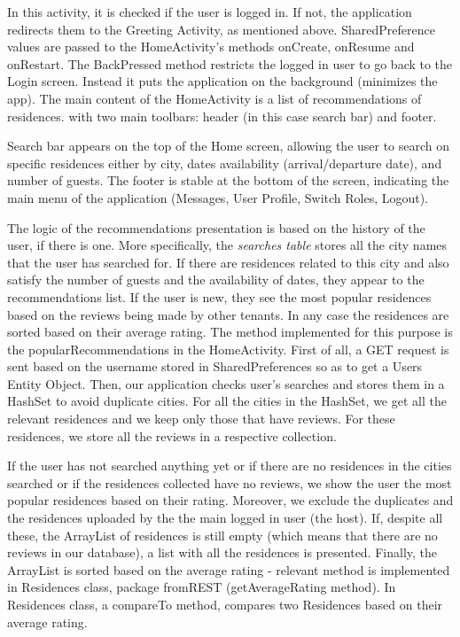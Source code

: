 \documentclass[12pt]{article}
\begin{document}
	In this activity, it is checked if the user is logged in. If not, the application redirects them to the Greeting Activity, as mentioned above. SharedPreference values are passed to the HomeActivity's methods onCreate, onResume and onRestart. The BackPressed method restricts the logged in user to go back to the Login screen. Instead it puts the application on the background (minimizes the app). The main content of the HomeActivity is a list of recommendations of residences. with two main toolbars: header (in this case search bar) and footer.
	
	Search bar appears on the top of the Home screen, allowing the user to search on specific residences either by city, dates availability (arrival/departure date), and number of guests. The footer is stable at the bottom of the screen, indicating the main menu of the application (Messages, User Profile, Switch Roles, Logout).
	
	The logic of the recommendations presentation is based on the history of the user, if there is one. More specifically, the \textit{searches table} stores all the city names that the user has searched for. If there are residences related to this city and also satisfy the number of guests and the availability of dates, they appear to the recommendations list. If the user is new, they see the most popular residences based on the reviews being made by other tenants. In any case the residences are sorted based on their average rating. The method implemented for this purpose is the popularRecommendations in the HomeActivity. First of all, a GET request is sent based on the username stored in SharedPreferences so as to get a Users Entity Object. Then, our application checks user's searches and stores them in a HashSet to avoid duplicate cities. For all the cities in the HashSet, we get all the relevant residences and we keep only those that have reviews. For these residences, we store all the reviews in a respective collection.
	
	If the user has not searched anything yet or if there are no residences in the cities searched or if the residences collected have no reviews, we show the user the most popular residences based on their rating. Moreover, we exclude the duplicates and the residences uploaded by the the main logged in user (the host). If, despite all these, the ArrayList of residences is still empty (which means that there are no reviews in our database), a list with all the residences is presented. Finally, the ArrayList is sorted based on the average rating - relevant method is implemented in Residences class, package fromREST (getAverageRating method). In Residences class, a compareTo method, compares two Residences based on their average rating. 
	
\end{document}

